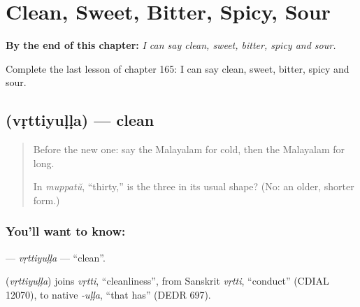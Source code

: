 
\chapter{Clean, Sweet, Bitter, Spicy, Sour}
\label{ch:ml-clean-sweet-bitter-spicy-sour}

\begin{chapteropening}
\textbf{By the end of this chapter:} \emph{I can say clean, sweet, bitter, spicy and sour.}

Complete the last lesson of chapter 165: I can say clean, sweet, bitter, spicy and sour.
\end{chapteropening}

\section[\texorpdfstring{\ml{വൃത്തിയുള്ള} (vṛttiyuḷḷa)}{വൃത്തിയുള്ള (vṛttiyuḷḷa)}]{ (vṛttiyuḷḷa) — clean}

\label{lesson:ML-C165-vrttiyulla}



\begin{quote}
Before the new one: say the Malayalam for cold, then the Malayalam for long.

In \emph{muppatŭ}, \textquotedblleft{}thirty,\textquotedblright{} is the three in its usual shape? (No: an older, shorter form.)
\end{quote}

\subsection*{You'll want to know: }
\textbf{} — \emph{vṛttiyuḷḷa} — \textquotedblleft{}clean\textquotedblright{}.

\begin{cousinweb}
\textbf{} (\emph{vṛttiyuḷḷa}) joins \emph{vṛtti}, \textquotedblleft{}cleanliness\textquotedblright{}, from Sanskrit \emph{vṛtti}, \textquotedblleft{}conduct\textquotedblright{} (CDIAL 12070), to native \emph{-uḷḷa}, \textquotedblleft{}that has\textquotedblright{} (DEDR 697).
\end{cousinweb}

